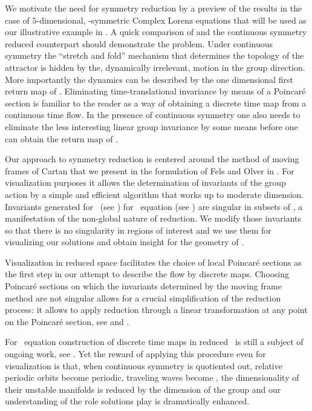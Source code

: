 We motivate the need for symmetry reduction by a preview of the results in the case of $5$-dimensional,
-symmetric Complex Lorenz equations that will be used as our illustrative example in .
 A quick comparison of
 and the continuous symmetry reduced  counterpart should demonstrate the problem.
Under continuous symmetry the ``stretch and fold'' mechanism that determines the topology of the attractor
is hidden by the, dynamically irrelevant, motion in the group direction. More importantly the dynamics can
be described by the one dimensional first return map of . Eliminating time-translational
invariance by means of a Poincar\'e section is familiar to the reader as a way of obtaining a discrete time map from
a continuous time flow. In the presence of continuous symmetry one also needs to eliminate the less interesting
linear group invariance by some means before one can obtain the return map of .

Our approach to symmetry reduction is centered around the method of moving frames of Cartan 
that we present in the formulation of Fels and Olver  in . For visualization
purposes it allows the determination of invariants of the group action by a simple
and efficient algorithm that works up to moderate dimension.
Invariants generated for \CLe\ (see ) for \KS\ equation
(see ) are singular in subsets of \statesp, a manifestation of the non-global
nature of reduction. We modify those invariants so that there is
no singularity in regions of interest and we use them for visualizing our solutions and obtain insight
for the geometry of \statesp.

Visualization in reduced space facilitates the choice of local Poincar\'e sections as the first step in
our attempt to describe the flow by discrete maps. Choosing Poincar\'e sections on which the invariants
determined by the moving frame method are not singular allows for a crucial simplification of the reduction
process: it allows to apply reduction through a linear transformation at any point on the Poincar\'e section,
see  and
.

For \KS\ equation construction of discrete time maps in reduced \statesp\ is still a subject of ongoing
work, see . Yet the reward of applying this procedure even for visualization
is that, when continuous symmetry is quotiented out, relative periodic
orbits become periodic, traveling waves become \eqva, the dimensionality of their unstable manifolds
is reduced by the dimension of the group and our understanding of the role solutions play is dramatically
enhanced.
